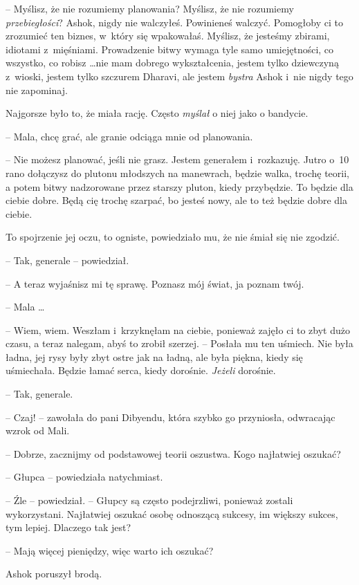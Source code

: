 \documentclass[oneside,polish,11pt,rmheadings]{mwbk}
\begin{document}
-- Myślisz, że nie rozumiemy planowania? Myślisz, że nie rozumiemy \textit{przebiegłości}? Ashok, nigdy nie walczyłeś. Powinieneś walczyć. Pomogłoby ci to zrozumieć ten biznes, w~który się wpakowałaś. Myślisz, że jesteśmy zbirami, idiotami z~mięśniami. Prowadzenie bitwy wymaga tyle samo umiejętności, co wszystko, co robisz  \ldots  nie mam dobrego wykształcenia, jestem tylko dziewczyną z~wioski, jestem tylko szczurem Dharavi, ale jestem \textit{bystra} Ashok i~nie nigdy tego nie zapominaj.

Najgorsze było to, że miała rację. Często \textit{myślał }o niej jako o bandycie. 

-- Mala, chcę grać, ale granie odciąga mnie od planowania.

-- Nie możesz planować, jeśli nie grasz. Jestem generałem i~rozkazuję. Jutro o~10 rano dołączysz do plutonu młodszych na manewrach, będzie walka, trochę teorii, a potem bitwy nadzorowane przez starszy pluton, kiedy przybędzie. To będzie dla ciebie dobre. Będą cię trochę szarpać, bo jesteś nowy, ale to też będzie dobre dla ciebie.

To spojrzenie jej oczu, to ogniste, powiedziało mu, że nie śmiał się nie zgodzić. 

-- Tak, generale -- powiedział.

-- A teraz wyjaśnisz mi tę sprawę. Poznasz mój świat, ja poznam twój.

-- Mala \ldots  

-- Wiem, wiem. Weszłam i~krzyknęłam na ciebie, ponieważ zajęło ci to zbyt dużo czasu, a teraz nalegam, abyś to zrobił szerzej. -- Posłała mu ten uśmiech. Nie była ładna, jej rysy były zbyt ostre jak na ładną, ale była piękna, kiedy się uśmiechała. Będzie łamać serca, kiedy dorośnie. \textit{Jeżeli} dorośnie. 

-- Tak, generale.

-- Czaj! -- zawołała do pani Dibyendu, która szybko go przyniosła, odwracając wzrok od Mali.

-- Dobrze, zacznijmy od podstawowej teorii oszustwa. Kogo najłatwiej oszukać? 

-- Głupca -- powiedziała natychmiast.

-- Źle -- powiedział. -- Głupcy są często podejrzliwi, ponieważ zostali wykorzystani. Najłatwiej oszukać osobę odnoszącą sukcesy, im większy sukces, tym lepiej. Dlaczego tak jest?

-- Mają więcej pieniędzy, więc warto ich oszukać?

Ashok poruszył brodą. 
\end{document}
